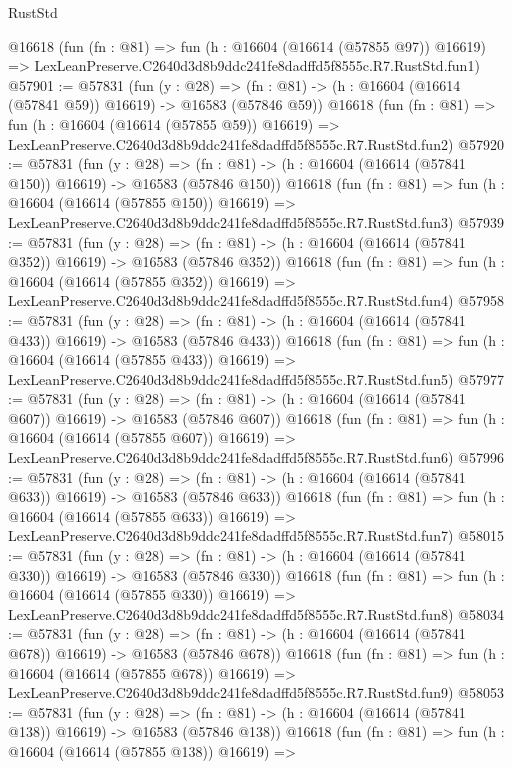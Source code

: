 \begin{lexlean}{RustStd}
\begin{coremodule}
    @16618
    (fun (fn : @81) =>
    fun (h : @16604 (@16614 (@57855 @97)) @16619) =>
    LexLeanPreserve.C2640d3d8b9ddc241fe8dadffd5f8555c.R7.RustStd.fun1)
@57901 := @57831
    (fun (y : @28) =>
    (fn : @81) -> (h : @16604 (@16614 (@57841 @59)) @16619) -> @16583 (@57846 @59))
    @16618
    (fun (fn : @81) =>
    fun (h : @16604 (@16614 (@57855 @59)) @16619) =>
    LexLeanPreserve.C2640d3d8b9ddc241fe8dadffd5f8555c.R7.RustStd.fun2)
@57920 := @57831
    (fun (y : @28) =>
    (fn : @81) -> (h : @16604 (@16614 (@57841 @150)) @16619) -> @16583 (@57846 @150))
    @16618
    (fun (fn : @81) =>
    fun (h : @16604 (@16614 (@57855 @150)) @16619) =>
    LexLeanPreserve.C2640d3d8b9ddc241fe8dadffd5f8555c.R7.RustStd.fun3)
@57939 := @57831
    (fun (y : @28) =>
    (fn : @81) -> (h : @16604 (@16614 (@57841 @352)) @16619) -> @16583 (@57846 @352))
    @16618
    (fun (fn : @81) =>
    fun (h : @16604 (@16614 (@57855 @352)) @16619) =>
    LexLeanPreserve.C2640d3d8b9ddc241fe8dadffd5f8555c.R7.RustStd.fun4)
@57958 := @57831
    (fun (y : @28) =>
    (fn : @81) -> (h : @16604 (@16614 (@57841 @433)) @16619) -> @16583 (@57846 @433))
    @16618
    (fun (fn : @81) =>
    fun (h : @16604 (@16614 (@57855 @433)) @16619) =>
    LexLeanPreserve.C2640d3d8b9ddc241fe8dadffd5f8555c.R7.RustStd.fun5)
@57977 := @57831
    (fun (y : @28) =>
    (fn : @81) -> (h : @16604 (@16614 (@57841 @607)) @16619) -> @16583 (@57846 @607))
    @16618
    (fun (fn : @81) =>
    fun (h : @16604 (@16614 (@57855 @607)) @16619) =>
    LexLeanPreserve.C2640d3d8b9ddc241fe8dadffd5f8555c.R7.RustStd.fun6)
@57996 := @57831
    (fun (y : @28) =>
    (fn : @81) -> (h : @16604 (@16614 (@57841 @633)) @16619) -> @16583 (@57846 @633))
    @16618
    (fun (fn : @81) =>
    fun (h : @16604 (@16614 (@57855 @633)) @16619) =>
    LexLeanPreserve.C2640d3d8b9ddc241fe8dadffd5f8555c.R7.RustStd.fun7)
@58015 := @57831
    (fun (y : @28) =>
    (fn : @81) -> (h : @16604 (@16614 (@57841 @330)) @16619) -> @16583 (@57846 @330))
    @16618
    (fun (fn : @81) =>
    fun (h : @16604 (@16614 (@57855 @330)) @16619) =>
    LexLeanPreserve.C2640d3d8b9ddc241fe8dadffd5f8555c.R7.RustStd.fun8)
@58034 := @57831
    (fun (y : @28) =>
    (fn : @81) -> (h : @16604 (@16614 (@57841 @678)) @16619) -> @16583 (@57846 @678))
    @16618
    (fun (fn : @81) =>
    fun (h : @16604 (@16614 (@57855 @678)) @16619) =>
    LexLeanPreserve.C2640d3d8b9ddc241fe8dadffd5f8555c.R7.RustStd.fun9)
@58053 := @57831
    (fun (y : @28) =>
    (fn : @81) -> (h : @16604 (@16614 (@57841 @138)) @16619) -> @16583 (@57846 @138))
    @16618
    (fun (fn : @81) =>
    fun (h : @16604 (@16614 (@57855 @138)) @16619) =>

\end{coremodule}
\end{lexlean}
